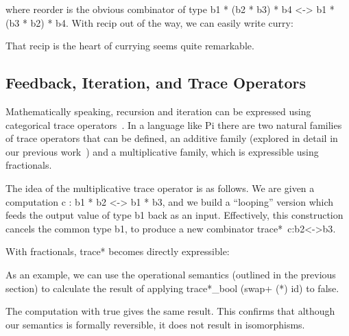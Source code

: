 \documentclass{llncs}
\begin{document}
\noindent
where {{reorder}} is the obvious combinator of type {{b1 * (b2 * b3) * b4 <-> b1 * (b3 * b2) * b4}}.
With {{recip}} out of the way, we can easily write {{curry}}:


\noindent That {{recip}} is the heart of currying seems quite remarkable.

\subsection{Feedback, Iteration, and Trace Operators}

Mathematically speaking, recursion and iteration can be expressed using
categorical trace
operators~\cite{joyal1996traced,Hasegawa:1997:RCS:645893.671607}.  In a
language like {{Pi}} there are two natural families of trace operators that
can be defined, an additive family (explored in detail in our previous
work~\cite{rc2011}) and a multiplicative family, which is expressible using
fractionals. 

The idea of the multiplicative trace operator is as follows. We are given a
computation {{c : b1 * b2 <-> b1 * b3}}, and we build a ``looping'' version
which feeds the output value of type {{b1}} back as an input. Effectively,
this construction cancels the common type {{b1}}, to produce a new combinator
{{trace*~c:b2<->b3}}. 

With fractionals, {{trace*}} becomes directly expressible:


As an example, we can use the operational semantics (outlined in the previous
section) to calculate the result of applying {{trace*_{bool} (swap+ (*) id)}}
to {{false}}.

\noindent The computation with {{true}} gives the same result. This confirms
that although our semantics is formally reversible, it does not result in
isomorphisms.
\end{document}
